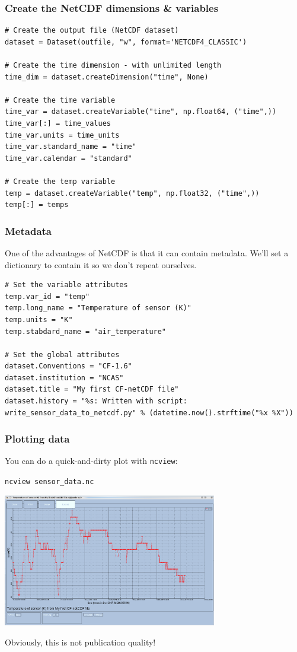 \documentclass[aspectratio=1610,9pt]{beamer} %
\begin{document}
\begin{frame}[fragile]
\frametitle{Create the NetCDF dimensions \& variables}

\begin{verbatim}
# Create the output file (NetCDF dataset)
dataset = Dataset(outfile, "w", format='NETCDF4_CLASSIC')

# Create the time dimension - with unlimited length
time_dim = dataset.createDimension("time", None)

# Create the time variable
time_var = dataset.createVariable("time", np.float64, ("time",))
time_var[:] = time_values
time_var.units = time_units
time_var.standard_name = "time" 
time_var.calendar = "standard" 

# Create the temp variable
temp = dataset.createVariable("temp", np.float32, ("time",))
temp[:] = temps
\end{verbatim}

\end{frame}
\begin{frame}[fragile]
\frametitle{Metadata}

One of the advantages of NetCDF is that it can contain metadata. We'll
set a dictionary to contain it so we don't repeat ourselves.

\begin{verbatim}
# Set the variable attributes
temp.var_id = "temp" 
temp.long_name = "Temperature of sensor (K)" 
temp.units = "K" 
temp.stabdard_name = "air_temperature" 

# Set the global attributes
dataset.Conventions = "CF-1.6" 
dataset.institution = "NCAS" 
dataset.title = "My first CF-netCDF file" 
dataset.history = "%s: Written with script: write_sensor_data_to_netcdf.py" % (datetime.now().strftime("%x %X"))
\end{verbatim}

\end{frame}
\begin{frame}
\frametitle{Plotting data}

You can do a quick-and-dirty plot with \texttt{ncview}:

\texttt{ncview sensor\_data.nc}

\includegraphics[width=0.7\textwidth]{sensor-data-ncview.png}

Obviously, this is not publication quality!

\end{frame}
\end{document}
